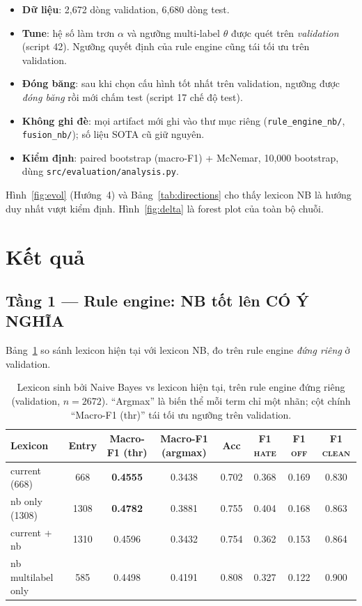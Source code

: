 \documentclass[11pt,a4paper]{article}
\newcommand{\ok}[1]{\textcolor{cok}{\textbf{#1}}}
\newcommand{\code}[1]{\texttt{\small #1}}
\begin{document}
\begin{itemize}[leftmargin=1.6em]
  \item \textbf{Dữ liệu}: 2{,}672 dòng validation, 6{,}680 dòng test.
  \item \textbf{Tune}: hệ số làm trơn $\alpha$ và ngưỡng multi-label $\theta$
  được quét trên \emph{validation} (script 42).  Ngưỡng quyết định của rule
  engine cũng tái tối ưu trên validation.
  \item \textbf{Đóng băng}: sau khi chọn cấu hình tốt nhất trên validation,
  ngưỡng được \emph{đóng băng} rồi mới chấm test (script 17 chế độ test).
  \item \textbf{Không ghi đè}: mọi artifact mới ghi vào thư mục riêng
  (\code{rule\_engine\_nb/}, \code{fusion\_nb/}); số liệu SOTA cũ giữ nguyên.
  \item \textbf{Kiểm định}: paired bootstrap (macro-F1) + McNemar, 10{,}000
  bootstrap, dùng \code{src/evaluation/analysis.py}.
\end{itemize}

Hình~\ref{fig:evol} (Hướng~4) và Bảng~\ref{tab:directions} cho thấy lexicon NB
là hướng duy nhất vượt kiểm định.  Hình~\ref{fig:delta} là forest plot của
toàn bộ chuỗi.

\section{Kết quả}
\label{sec:results}

\subsection{Tầng 1 --- Rule engine: NB tốt lên CÓ Ý NGHĨA}
\label{sec:res-rule}

Bảng~\ref{tab:rule} so sánh lexicon hiện tại với lexicon NB, đo trên rule engine
\emph{đứng riêng} ở validation.

\begin{table}[H]
  \centering
  \small
  \caption{Lexicon sinh bởi Naive Bayes vs lexicon hiện tại, trên rule engine
  đứng riêng (validation, $n=2672$).  ``Argmax'' là biến thể mỗi term chỉ một
  nhãn; cột chính ``Macro-F1 (thr)'' tái tối ưu ngưỡng trên validation.}
  \label{tab:rule}
  \begin{tabular}{lccccccc}
    \toprule
    Lexicon & Entry & Macro-F1 (thr) & Macro-F1 (argmax) & Acc & F1 \textsc{hate} & F1 \textsc{off} & F1 \textsc{clean} \\
    \midrule
    current (668)          & 668  & \textbf{0.4555} & 0.3438 & 0.702 & 0.368 & 0.169 & 0.830 \\
    nb only (1308)         & 1308 & \ok{0.4782}     & 0.3881 & 0.755 & 0.404 & 0.168 & 0.863 \\
    current + nb           & 1310 & 0.4596          & 0.3432 & 0.754 & 0.362 & 0.153 & 0.864 \\
    nb multilabel only     & 585  & 0.4498          & 0.4191 & 0.808 & 0.327 & 0.122 & 0.900 \\
    \bottomrule
  \end{tabular}
\end{table}
\end{document}
